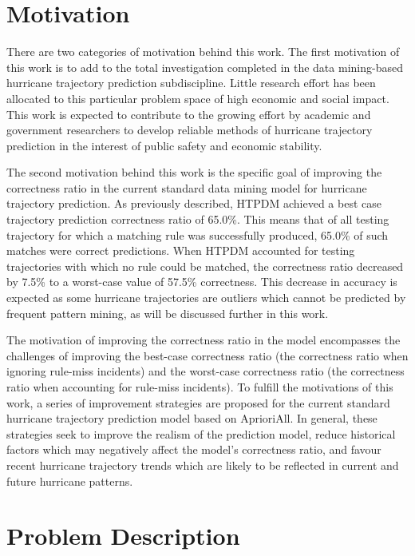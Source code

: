 \documentclass[12pt,conference]{IEEEtran}
\begin{document}
\section{Motivation}

There are two categories of motivation behind this work. The first motivation of this work is to add to the total investigation completed in the data mining-based hurricane trajectory prediction subdiscipline. Little research effort has been allocated to this particular problem space of high economic and social impact. This work is expected to contribute to the growing effort by academic and government researchers to develop reliable methods of hurricane trajectory prediction in the interest of public safety and economic stability.

The second motivation behind this work is the specific goal of improving the correctness ratio in the current standard data mining model for hurricane trajectory prediction. As previously described, HTPDM achieved a best case trajectory prediction correctness ratio of 65.0\%. This means that of all testing trajectory for which a matching rule was successfully produced, 65.0\% of such matches were correct predictions. When HTPDM accounted for testing trajectories with which no rule could be matched, the correctness ratio decreased by 7.5\% to a worst-case value of 57.5\% correctness. This decrease in accuracy is expected as some hurricane trajectories are outliers which cannot be predicted by frequent pattern mining, as will be discussed further in this work.

The motivation of improving the correctness ratio in the model encompasses the challenges of improving the best-case correctness ratio (the correctness ratio when ignoring rule-miss incidents) and the worst-case correctness ratio (the correctness ratio when accounting for rule-miss incidents). To fulfill the motivations of this work, a series of improvement strategies are proposed for the current standard hurricane trajectory prediction model based on AprioriAll. In general, these strategies seek to improve the realism of the prediction model, reduce historical factors which may negatively affect the model's correctness ratio, and favour recent hurricane trajectory trends which are likely to be reflected in current and future hurricane patterns.

\section{Problem Description}
\end{document}
